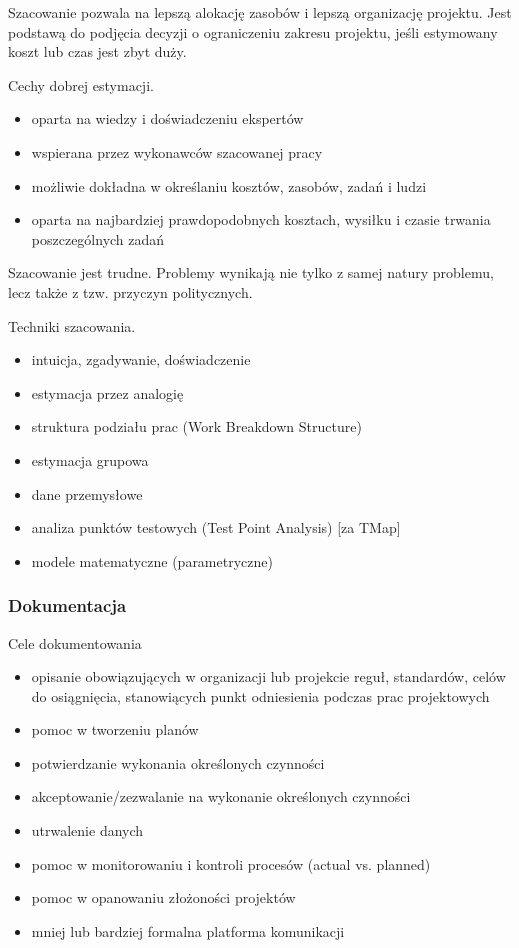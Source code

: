 \documentclass[../main.tex]{subfiles}
\begin{document}
    Szacowanie pozwala na lepszą alokację zasobów i lepszą organizację projektu. Jest podstawą do podjęcia
    decyzji o ograniczeniu zakresu projektu, jeśli estymowany koszt lub czas jest zbyt duży.

    Cechy dobrej estymacji.
    \begin{itemize}
        \item oparta na wiedzy i doświadczeniu ekspertów
        \item wspierana przez wykonawców szacowanej pracy
        \item możliwie dokładna w określaniu kosztów, zasobów, zadań i ludzi
        \item oparta na najbardziej prawdopodobnych kosztach, wysiłku i czasie trwania poszczególnych zadań
    \end{itemize}
    Szacowanie jest trudne. Problemy wynikają nie tylko z samej natury problemu, lecz także z tzw. przyczyn politycznych.


    Techniki szacowania.
    \begin{itemize}
        \item intuicja, zgadywanie, doświadczenie
        \item estymacja przez analogię
        \item struktura podziału prac (Work Breakdown Structure)
        \item estymacja grupowa
        \item dane przemysłowe
        \item analiza punktów testowych (Test Point Analysis) [za TMap]
        \item modele matematyczne (parametryczne)
    \end{itemize}

    \subsubsection{Dokumentacja}

    Cele dokumentowania
    \begin{itemize}
        \item opisanie obowiązujących w organizacji lub projekcie reguł, standardów, celów do osiągnięcia, stanowiących punkt odniesienia podczas prac projektowych
        \item pomoc w tworzeniu planów
        \item potwierdzanie wykonania określonych czynności
        \item akceptowanie/zezwalanie na wykonanie określonych czynności
        \item utrwalenie danych
        \item pomoc w monitorowaniu i kontroli procesów (actual vs. planned)
        \item pomoc w opanowaniu złożoności projektów
        \item mniej lub bardziej formalna platforma komunikacji
    \end{itemize}
\end{document}
